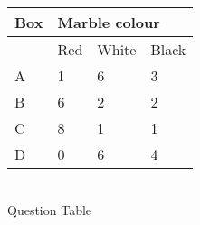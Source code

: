 \begin{tabular}{|l|l|l|l|}\hline
\multicolumn{1}{|l|}{Box}& \multicolumn{3}{|l|}{Marble colour} \\\hline
        &Red    &White  &Black\\\hline
A       &1      &6      &3\\\hline
B       &6      &2      &2\\\hline
C       &8      &1      &1\\\hline
D       &0      &6      &4\\\hline
\end{tabular}\\
\caption{\label{table2}Question Table}
